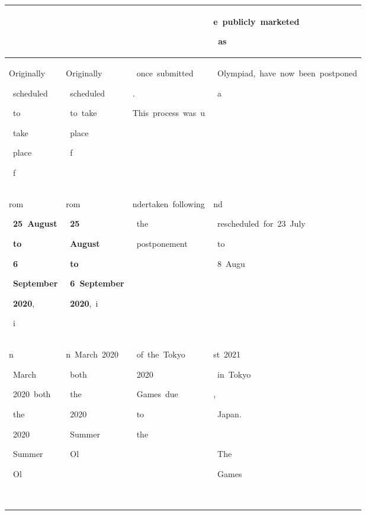 \begin{table}[h]
\begin{tabular}{ l l l l }
  &  &  & \colorbox{cm_0!40}{\strut e\ publicly\ marketed}\colorbox{cm_12!40}{\strut \ as} \\ 
  \hline \colorbox{cm_63!40}{\strut Originally}\colorbox{cm_46!40}{\strut \ scheduled}\colorbox{cm_37!40}{\strut \ to}\colorbox{cm_63!40}{\strut \ take}\colorbox{cm_32!40}{\strut \ place}\colorbox{cm_22!40}{\strut \ f} & \colorbox{cm_0!40}{\strut Originally}\colorbox{cm_12!40}{\strut \ scheduled}\colorbox{cm_25!40}{\strut \ to\ take}\colorbox{cm_38!40}{\strut \ place}\colorbox{cm_12!40}{\strut \ f} & \colorbox{cm_0!40}{\strut \ once\ submitted}\colorbox{cm_12!40}{\strut .}\colorbox{cm_25!40}{\strut }\colorbox{cm_0!40}{\strut This\ process\ was\ u} & \colorbox{cm_0!40}{\strut \ Olympiad,\ have\ now\ been\ postponed}\colorbox{cm_12!40}{\strut \ a} \\ 
 \colorbox{cm_22!40}{\strut rom}\colorbox{cm_63!40}{\strut \ \textbf{25\ August}}\colorbox{cm_35!40}{\strut \ \textbf{to}}\colorbox{cm_63!40}{\strut \ \textbf{6}}\colorbox{cm_34!40}{\strut \ \textbf{September}}\colorbox{cm_60!40}{\strut \ \textbf{2020},}\colorbox{cm_16!40}{\strut \ i} & \colorbox{cm_12!40}{\strut rom}\colorbox{cm_25!40}{\strut \ \textbf{25}}\colorbox{cm_38!40}{\strut \ \textbf{August}}\colorbox{cm_51!40}{\strut \ \textbf{to}}\colorbox{cm_63!40}{\strut \ \textbf{6\ September}}\colorbox{cm_12!40}{\strut \ \textbf{2020},\ i} & \colorbox{cm_0!40}{\strut ndertaken\ following}\colorbox{cm_12!40}{\strut \ the}\colorbox{cm_0!40}{\strut \ postponement} & \colorbox{cm_12!40}{\strut nd}\colorbox{cm_0!40}{\strut \ rescheduled\ for\ 23\ July}\colorbox{cm_12!40}{\strut \ to}\colorbox{cm_0!40}{\strut \ 8\ Augu} \\ 
 \colorbox{cm_16!40}{\strut n}\colorbox{cm_55!40}{\strut \ March}\colorbox{cm_63!40}{\strut \ 2020\ both}\colorbox{cm_41!40}{\strut \ the}\colorbox{cm_0!40}{\strut \ 2020}\colorbox{cm_44!40}{\strut \ Summer}\colorbox{cm_63!40}{\strut \ Ol} & \colorbox{cm_12!40}{\strut n\ March\ 2020}\colorbox{cm_0!40}{\strut \ both}\colorbox{cm_12!40}{\strut \ the}\colorbox{cm_25!40}{\strut \ 2020}\colorbox{cm_38!40}{\strut \ Summer}\colorbox{cm_51!40}{\strut \ Ol} & \colorbox{cm_12!40}{\strut \ of\ the\ Tokyo}\colorbox{cm_0!40}{\strut \ 2020}\colorbox{cm_12!40}{\strut \ Games\ due}\colorbox{cm_25!40}{\strut \ to}\colorbox{cm_12!40}{\strut \ the}\colorbox{cm_0!40}{\strut \ } & \colorbox{cm_0!40}{\strut st\ 2021}\colorbox{cm_12!40}{\strut \ in\ Tokyo}\colorbox{cm_0!40}{\strut ,}\colorbox{cm_12!40}{\strut \ Japan.}\colorbox{cm_25!40}{\strut \ }\colorbox{cm_12!40}{\strut \ The}\colorbox{cm_25!40}{\strut \ Games}\colorbox{cm_38!40}{\strut \ } \\ 

\end{tabular}
\end{table}
